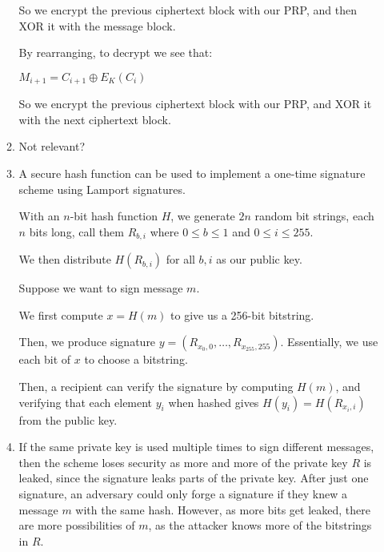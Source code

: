 \begin{enumerate}[label=(\alph*)]
\begin{enumerate}[label=(\roman*)]
          So we encrypt the previous ciphertext block with our PRP, and then XOR it with the message block.

          By rearranging, to decrypt we see that:

          $M_{i+1} = C_{i+1} \oplus E_K(C_i)$

          So we encrypt the previous ciphertext block with our PRP, and XOR it with the next ciphertext block.

          \item
            Not relevant?

            \item
              A secure hash function can be used to implement a one-time signature scheme using Lamport signatures.

              With an $n$-bit hash function $H$, we generate $2n$ random bit strings, each $n$ bits long, call them $R_{b,i}$ where $0 \leq b \leq 1$ and $0 \leq i \leq 255$.

              We then distribute $H(R_{b,i})$ for all $b,i$ as our public key.

              Suppose we want to sign message $m$.

              We first compute $x = H(m)$ to give us a 256-bit bitstring.

              Then, we produce signature $y = (R_{x_0, 0}, \ldots, R_{x_{255}, 255})$. Essentially, we use each bit of $x$ to choose a bitstring.

              Then, a recipient can verify the signature by computing $H(m)$, and verifying that each element $y_i$ when hashed gives $H(y_i) = H(R_{x_i, i})$ from the public key.

              \item
                If the same private key is used multiple times to sign different messages, then the scheme loses security as more and more of the private key $R$ is leaked, since the signature leaks parts of the private key. After just one signature, an adversary could only forge a signature if they knew a message $m$ with the same hash. However, as more bits get leaked, there are more possibilities of $m$, as the attacker knows more of the bitstrings in $R$.
          
      \end{enumerate}
        
    \end{enumerate}

